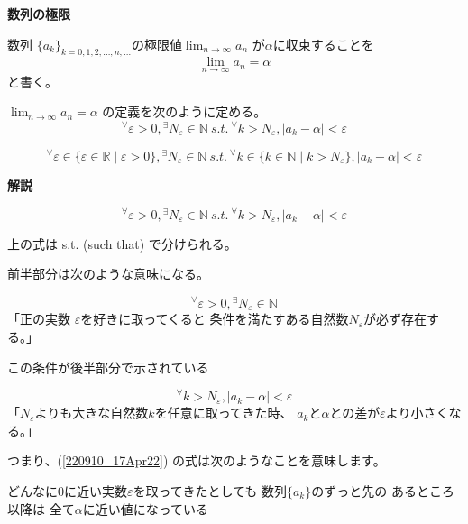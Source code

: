 \documentclass[12pt,b5paper]{ltjsarticle}
\begin{document}
\textbf{数列の極限}

数列 $\{a_k\}_{k=0,1,2,\dots ,n,\dots}$の極限値$\displaystyle \lim_{n\rightarrow\infty}a_n$
が$\alpha$に収束することを
\[
 \lim_{n\rightarrow\infty}a_n = \alpha
\]
と書く。

\dotfill

$\displaystyle \lim_{n\rightarrow\infty}a_n = \alpha$
の定義を次のように定める。
\begin{equation}
 {}^\forall \varepsilon > 0 ,
 {}^\exists N_{\varepsilon}\in \mathbb{N}
 \ s.t. \ {}^\forall k > N_\varepsilon ,
 \lvert a_k - \alpha \rvert< \varepsilon\label{220910_17Apr22}
\end{equation}

\dotfill

\[
 {}^\forall \varepsilon \in \{ \varepsilon \in \mathbb{R} \mid \varepsilon > 0 \},
 {}^\exists N_{\varepsilon}\in \mathbb{N}
 \ s.t. \ {}^\forall k \in \{ k \in \mathbb{N} \mid k > N_\varepsilon \},
 \lvert a_k - \alpha \rvert< \varepsilon
\]

\dotfill

\textbf{解説}

\begin{equation}
 {}^\forall \varepsilon > 0 ,
 {}^\exists N_{\varepsilon}\in \mathbb{N}
 \ s.t. \ {}^\forall k > N_\varepsilon ,
 \lvert a_k - \alpha \rvert< \varepsilon
\end{equation}

上の式は s.t. (such that) で分けられる。

前半部分は次のような意味になる。

\begin{equation}
 {}^\forall \varepsilon > 0 ,
  {}^\exists N_{\varepsilon}\in \mathbb{N}
\end{equation}
「正の実数 $\varepsilon$を好きに取ってくると
条件を満たすある自然数$N_{\varepsilon}$が必ず存在する。」


この条件が後半部分で示されている

\begin{equation}
 {}^\forall k > N_\varepsilon ,
 \lvert a_k - \alpha \rvert< \varepsilon
\end{equation}
「$N_{\varepsilon}$よりも大きな自然数$k$を任意に取ってきた時、
$a_k$と$\alpha$との差が$\varepsilon$より小さくなる。」



つまり、(\ref{220910_17Apr22}) の式は次のようなことを意味します。

どんなに0に近い実数$\varepsilon$を取ってきたとしても
数列$\{a_k\}$のずっと先の
あるところ以降は
全て$\alpha$に近い値になっている
\end{document}
